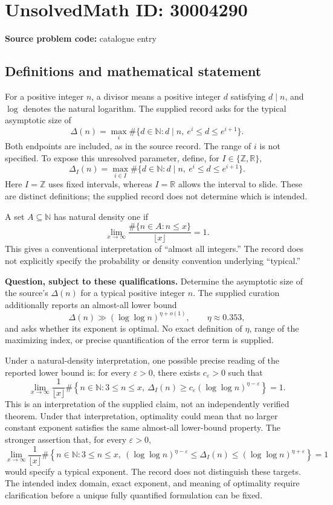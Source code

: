 \documentclass[11pt]{article}
\newcommand{\N}{\mathbb{N}}
\newcommand{\Z}{\mathbb{Z}}
\newcommand{\R}{\mathbb{R}}
\begin{document}
\section*{UnsolvedMath ID: 30004290}
\textbf{Source problem code:} catalogue entry
\subsection{Definitions and mathematical statement}
For a positive integer \(n\), a divisor means a positive integer \(d\) satisfying \(d\mid n\), and \(\log\) denotes the natural logarithm. The supplied record asks for the typical asymptotic size of
\[
\Delta(n)=\max_i\#\{d\in\N:d\mid n,\ e^i\leq d\leq e^{i+1}\}.
\]
Both endpoints are included, as in the source record. The range of \(i\) is not specified. To expose this unresolved parameter, define, for \(I\in\{\Z,\R\}\),
\[
\Delta_I(n)=\max_{i\in I}\#\{d\in\N:d\mid n,\ e^i\leq d\leq e^{i+1}\}.
\]
Here \(I=\Z\) uses fixed intervals, whereas \(I=\R\) allows the interval to slide. These are distinct definitions; the supplied record does not determine which is intended.

A set \(A\subseteq\N\) has natural density one if
\[
\lim_{x\to\infty}\frac{\#\{n\in A:n\leq x\}}{\lfloor x\rfloor}=1.
\]
This gives a conventional interpretation of ``almost all integers.'' The record does not explicitly specify the probability or density convention underlying ``typical.''

\textbf{Question, subject to these qualifications.} Determine the asymptotic size of the source's \(\Delta(n)\) for a typical positive integer \(n\). The supplied curation additionally reports an almost-all lower bound
\[
\Delta(n)\gg(\log\log n)^{\eta+o(1)},
\qquad \eta\approx0.353,
\]
and asks whether its exponent is optimal. No exact definition of \(\eta\), range of the maximizing index, or precise quantification of the error term is supplied.

Under a natural-density interpretation, one possible precise reading of the reported lower bound is: for every \(\varepsilon>0\), there exists \(c_\varepsilon>0\) such that
\[
\lim_{x\to\infty}\frac{1}{\lfloor x\rfloor}
\#\left\{n\in\N:3\leq n\leq x,\ 
\Delta_I(n)\geq c_\varepsilon(\log\log n)^{\eta-\varepsilon}\right\}=1.
\]
This is an interpretation of the supplied claim, not an independently verified theorem. Under that interpretation, optimality could mean that no larger constant exponent satisfies the same almost-all lower-bound property. The stronger assertion that, for every \(\varepsilon>0\),
\[
\lim_{x\to\infty}\frac{1}{\lfloor x\rfloor}
\#\left\{n\in\N:3\leq n\leq x,\ 
(\log\log n)^{\eta-\varepsilon}\leq\Delta_I(n)
\leq(\log\log n)^{\eta+\varepsilon}\right\}=1
\]
would specify a typical exponent. The record does not distinguish these targets. The intended index domain, exact exponent, and meaning of optimality require clarification before a unique fully quantified formulation can be fixed.
\end{document}
